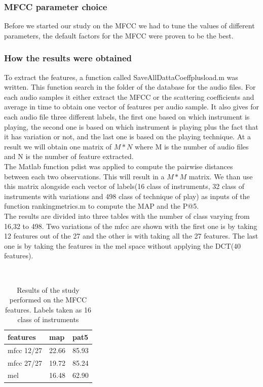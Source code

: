 \documentclass[hidelinks,12pt]{report}
\begin{document}
\subsubsection{MFCC parameter choice}
Before we started our study on the MFCC we had to tune the values of different parameters, the default factors for the MFCC were proven to be the best.
\subsubsection{How the results were obtained}
To extract the features, a function called SaveAllDattaCoeffplusload.m was written. This function search in the folder of the database for the audio files. For each audio samples it either extract the MFCC or the scattering coefficients and average in time to obtain one vector of features per audio sample. It also gives for each audio file three different labels, the first one based on which instrument is playing, the second one is based on which instrument is playing plus the fact that it has variation or not, and the last one is based on the playing technique. At a result we will obtain one matrix of $M*N$ where M is the number of audio files and N is the number of feature extracted.\\
The Matlab function pdist was applied to compute the pairwise distances between each two observations. This will result in a $M*M$ matrix. We than use this matrix alongside each vector of labels(16 class of instruments, 32 class of instruments with variations and 498 class of technique of play) as inputs of the function rankingmetrics.m to compute the MAP and the P@5.\\
The results are divided into three tables with the number of class varying from 16,32 to 498. Two variations of the mfcc are shown with the first one is by taking 12 features out of the 27 and the other is with taking all the 27 features. The last one is by taking the features in the mel space without applying the DCT(40 features).\\
\begin{table} [H]
\begin{center} 
\ 
 \setlength{\tabcolsep}{.16667em} 
\begin{tabular}{ | l | l | l | }
features  & map & pat5  \\ 
\hline 
mfcc 12/27  & 22.66 & 85.93  \\ 

mfcc 27/27  & 19.72 & 85.24  \\ 

mel &  16.48 & 62.90 \\ 

\end{tabular} 
\end{center} 
\caption{Results of the study performed on the MFCC features. Labels taken as 16 class of instruments} 
\label{you} 
\end{table} 
\end{document}
